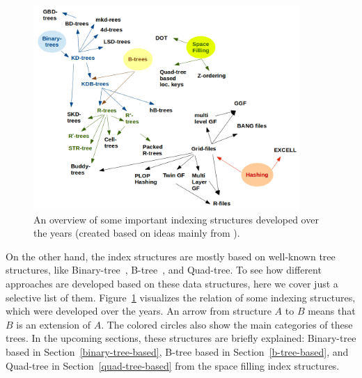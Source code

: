 \documentclass[a4paper,12pt]{article}
\begin{document}
\begin{figure}
\centering
\includegraphics[width=0.9\textwidth]{Trees}
\caption{An overview of some important indexing structures developed over the years 
(created based on ideas mainly from \cite{survey}).}
\label{trees}
\end{figure}

On the other hand, the index structures are mostly based on well-known tree structures, like Binary-tree~\cite{binarytree}, B-tree~\cite{btree}, and Quad-tree. 
To see how different approaches are developed based on these data structures, here we cover just a selective list of them. Figure~\ref{trees} visualizes the relation of some indexing structures, which were developed over the years. An arrow from structure $A$ to $B$ means that $B$ is an extension of $A$. The colored circles also show the main categories of these
trees. In the upcoming sections, these structures are briefly explained:
Binary-tree based in Section~\ref{binary-tree-based}, 
B-tree based in Section~\ref{b-tree-based}, 
and Quad-tree in Section~\ref{quad-tree-based} from the space filling index structures.
\end{document}
